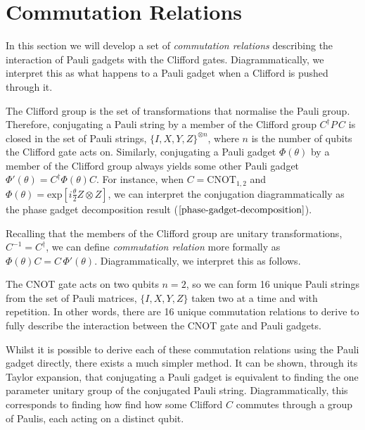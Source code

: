 \section{Commutation Relations}

In this section we will develop a set of \textit{commutation relations} describing the interaction of Pauli gadgets with the Clifford gates. Diagrammatically, we interpret this as what happens to a Pauli gadget when a Clifford is pushed through it.

The Clifford group is the set of transformations that normalise the Pauli group. Therefore, conjugating a Pauli string by a member of the Clifford group $C^\dagger P \, C$ is closed in the set of Pauli strings, $\{I, X, Y, Z\}^{\otimes n}$, where $n$ is the number of qubits the Clifford gate acts on. Similarly, conjugating a Pauli gadget $\Phi(\theta)$ by a member of the Clifford group always yields some other Pauli gadget $\Phi'(\theta) = C^\dagger \Phi(\theta) C$. For instance, when $C = \text{CNOT}_{1, 2}$ and $\Phi(\theta) = \text{exp} \left[ i\frac{\theta}{2} Z \otimes Z \right]$, we can interpret the conjugation diagrammatically as the phase gadget decomposition result ($\ref{phase-gadget-decomposition}$).


Recalling that the members of the Clifford group are unitary transformations, $C^{-1} = C^\dagger$, we can define \textit{commutation relation} more formally as $\Phi(\theta) C = C \, \Phi'(\theta)$. Diagrammatically, we interpret this as follows.


The CNOT gate acts on two qubits $n = 2$, so we can form 16 unique Pauli strings from the set of Pauli matrices, $\{I, X, Y, Z\}$ taken two at a time and with repetition. In other words, there are 16 unique commutation relations to derive to fully describe the interaction between the CNOT gate and Pauli gadgets.

Whilst it is possible to derive each of these commutation relations using the Pauli gadget directly, there exists a much simpler method. It can be shown, through its Taylor expansion, that conjugating a Pauli gadget is equivalent to finding the one parameter unitary group of the conjugated Pauli string. Diagrammatically, this corresponds to finding how find how some Clifford $C$ commutes through a group of Paulis, each acting on a distinct qubit.


